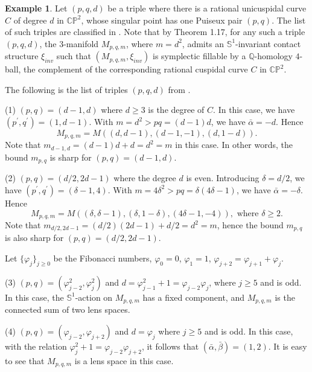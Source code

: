 \documentclass[11pt]{amsart}
\theoremstyle{plain}
\numberwithin{theorem}{section}
\theoremstyle{definition}
\newtheorem{example}[theorem]{Example}
\newcommand{\C}{{\mathbb C}}
\newcommand{\Q}{{\mathbb Q}}
\renewcommand{\P}{{\mathbb P}}
\newcommand{\s}{{\mathbb S}}
\begin{document}
\begin{example}
Let $(p,q,d)$ be a triple where there is a rational unicuspidal curve $C$ of degree $d$ in $\C\P^2$,
whose singular point has one Puiseux pair $(p,q)$. The list of such triples are classified in \cite{F}.
Note that by Theorem 1.17, for any such a triple $(p,q,d)$, the $3$-manifold $M_{p,q,m}$, where $m=d^2$, admits
an $\s^1$-invariant contact structure $\xi_{inv}$ such that $(M_{p,q,m},\xi_{inv})$ is symplectic
fillable by a $\Q$-homology $4$-ball, the complement of the corresponding rational cuspidal curve $C$ in $\C\P^2$.

The following is the list of triples $(p,q,d)$ from \cite{F}.


(1) $(p,q)=(d-1,d)$ where $d\geq 3$ is the degree of $C$. In this case, we have $(p^\prime,q^\prime)=
(1,d-1)$. With $m=d^2>pq=(d-1)d$, we have $\bar{\alpha}=-d$. Hence 
$$
M_{p,q,m}=M((d,d-1), (d-1,-1), (d, 1-d)). 
$$
Note that $m_{d-1,d}=(d-1)d+d=d^2=m$ in this case. In other words, the bound $m_{p,q}$ is sharp for 
$(p,q)=(d-1,d)$. 

(2) $(p,q)=(d/2,2d-1)$ where the degree $d$ is even. Introducing $\delta=d/2$, we have 
$(p^\prime,q^\prime)=(\delta-1, 4)$. With $m=4\delta^2>pq=\delta(4\delta-1)$, we have 
$\bar{\alpha}=-\delta$. Hence 
$$
M_{p,q,m}=M((\delta,\delta-1), (\delta, 1-\delta), (4\delta-1, -4)), \mbox{ where } \delta\geq 2. 
$$
Note that $m_{d/2,2d-1}=(d/2)(2d-1)+d/2=d^2=m$, hence the bound $m_{p,q}$ is also sharp for $(p,q)=(d/2,2d-1)$. 

\vspace{2mm}

Let $\{\varphi_j\}_{j\geq 0}$ be the Fibonacci numbers, $\varphi_0=0$, $\varphi_1=1$,
$\varphi_{j+2}=\varphi_{j+1}+\varphi_j$.

\vspace{2mm}

(3) $(p,q)=(\varphi_{j-2}^2,\varphi_j^2)$ and $d=\varphi_{j-1}^2+1=\varphi_{j-2}\varphi_j$, where 
$j\geq 5$ and is odd. In this case, the $\s^1$-action on $M_{p,q,m}$ has a fixed component,  and 
$M_{p,q,m}$ is the connected sum of two lens spaces. 

(4) $(p,q)=(\varphi_{j-2}, \varphi_{j+2})$ and $d=\varphi_j$ where $j\geq 5$ and is odd. In this case,
with the relation $\varphi_j^2+1=\varphi_{j-2}\varphi_{j+2}$, it follows that 
$(\bar{\alpha}, \bar{\beta})=(1,2)$. It is easy to see that $M_{p,q,m}$ is a lens space in this case.


\end{example}
\end{document}
